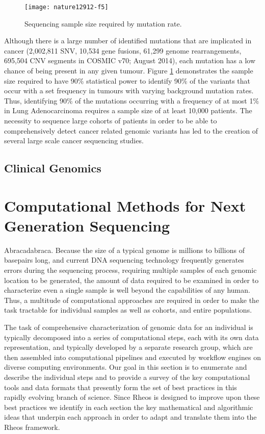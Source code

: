 \begin{figure}[H]
\texttt{[image: nature12912-f5]}
\centering
\caption {Sequencing sample size required by mutation rate\autocite{lawrence2014discovery}.}
\label{fig:nature12912-f5}
\end{figure}

Although there is a large number of identified mutations that are implicated in cancer (2,002,811 SNV,  10,534 gene fusions, 61,299 genome rearrangements, 695,504 CNV segments in COSMIC v70; August 2014)\autocite{forbes2015cosmic}, each mutation has a low chance of being present in any given tumour. Figure \ref{fig:nature12912-f5} demonstrates the sample size required to have 90\% statistical power to identify  90\% of the variants that occur with a set frequency in tumours with varying background mutation rates. Thus, identifying 90\% of the mutations occurring with a frequency of at most 1\% in Lung Adenocarcinoma requires a sample size of at least 10,000 patients. The necessity to sequence large cohorts of patients in order to be able to comprehensively detect  cancer related genomic variants has led to the creation of several large scale cancer sequencing studies.

\subsection{Clinical Genomics}

\section{Computational Methods for Next Generation Sequencing}
Abracadabraca. Because the size of a typical genome is millions to billions of basepairs long, and current DNA sequencing technology frequently generates errors during the sequencing process, requiring multiple samples of each genomic location to be generated, the amount of data required to be examined in order to characterize even a single sample is well beyond the capabilities of any human. Thus, a multitude of computational approaches are required in order to make the task tractable for individual samples as well as cohorts, and entire populations.

The task of comprehensive characterization of genomic data for an individual is typically decomposed into a series of computational steps, each with its own data representation, and typically developed by a separate research group, which are then assembled into computational pipelines and executed by workflow engines on diverse computing environments. Our goal in this section is to enumerate and describe the individual steps and to provide a survey of the key computational tools and data formats that presently form the set of best practices in this rapidly evolving branch of science. Since Rheos is designed to improve upon these best practices we identify in each section the key mathematical and algorithmic ideas that underpin each approach in order to adapt and translate them into the Rheos framework.

